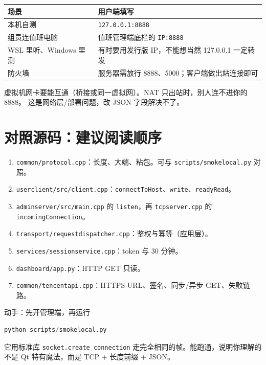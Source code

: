 \documentclass[UTF8,a4paper,11pt]{ctexart}
\begin{document}
\begin{center}
\begin{tabular}{lp{8.8cm}}
\toprule
场景 & 用户端填写 \\
\midrule
本机自测 & \texttt{127.0.0.1:8888} \\
组员连值班电脑 & 值班管理端底栏的 \texttt{IP:8888} \\
WSL 里听、Windows 里测 & 有时要用发行版 IP，不能想当然 127.0.0.1 一定转发 \\
防火墙 & 服务器需放行 8888、5000；客户端做出站连接即可 \\
\bottomrule
\end{tabular}
\end{center}

虚拟机网卡要能互通（桥接或同一虚拟网）。NAT 只出站时，别人连不进你的 8888。
这是网络层/部署问题，改 JSON 字段解决不了。

\section{对照源码：建议阅读顺序}

\begin{enumerate}[leftmargin=1.6em]
  \item \texttt{common/protocol.cpp}：长度、大端、粘包。可与 \texttt{scripts/smokelocal.py} 对照。
  \item \texttt{userclient/src/client.cpp}：\texttt{connectToHost}、\texttt{write}、\texttt{readyRead}。
  \item \texttt{adminserver/src/main.cpp} 的 \texttt{listen}，再 \texttt{tcpserver.cpp} 的 \texttt{incomingConnection}。
  \item \texttt{transport/requestdispatcher.cpp}：鉴权与幂等（应用层）。
  \item \texttt{services/sessionservice.cpp}：token 与 30 分钟。
  \item \texttt{dashboard/app.py}：HTTP GET 只读。
  \item \texttt{common/tencentapi.cpp}：HTTPS URL、签名、同步/异步 GET、失败链路。
\end{enumerate}

动手：先开管理端，再运行

\begin{lstlisting}[language=Python]
python scripts/smokelocal.py
\end{lstlisting}

它用标准库 \texttt{socket.create\_connection} 走完全相同的帧。能跑通，说明你理解的不是 Qt 特有魔法，而是 TCP + 长度前缀 + JSON。
\end{document}
